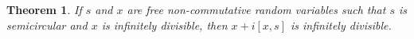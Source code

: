\documentclass{amsart}
\newtheorem{thm}[claim]{Theorem}
\newcommand{\bE}{\mathbb{E}}
\begin{document}
%
\begin{thm}\label{thm:2}
	If $s$ and $x $ are free non-commutative random variables such that $s $ is semicircular and $ x $ is infinitely divisible, then $ x + i[x, s] $ is infinitely divisible.
\end{thm}
\end{document}
